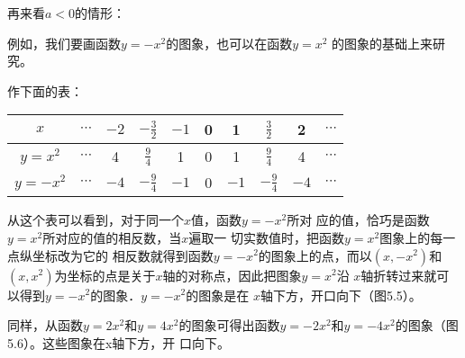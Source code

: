 再来看$a<0$的情形：

例如，我们要画函数$y=-x^2$的图象，也可以在函数$y=x^2$
的图象的基础上来研究。

作下面的表：
\begin{center}
\begin{tabular}{c|ccccccccc}
    \hline
$x$ &$\cdots$ & $-2$  & $-\tfrac{3}{2}$  & $-1$   & 0   & 1&$\tfrac{3}{2}$& 2&$\cdots$\\
\hline
$y=x^2$ &$\cdots$ & 4&$\tfrac{9}{4}$&1  & 0   & 1&$\tfrac{9}{4}$&4&$\cdots$\\
$y=-x^2$ &$\cdots$ & $-4$&$-\tfrac{9}{4}$&$-1$  & 0   & $-1$&$-\tfrac{9}{4}$&$-4$&$\cdots$\\
\hline
\end{tabular}    
\end{center}

从这个表可以看到，对于同一个$x$值，函数$y=-x^2$所对
应的值，恰巧是函数$y=x^2$所对应的值的相反数，当$x$遍取一
切实数值时，把函数$y=x^2$图象上的每一点纵坐标改为它的
相反数就得到函数$y=-x^2$的图象上的点，而以$(x,-x^2)$和
$(x,x^2)$为坐标的点是关于$x$轴的对称点，因此把图象$y=x^2$沿
$x$轴折转过来就可以得到$y=-x^2$的图象．$y=-x^2$的图象是在
$x$轴下方，开口向下（图5.5）。

同样，从函数$y=2x^2$和$y=4x^2$的图象可得出函数$y=
-2x^2$和$y=-4x^2$的图象（图5.6）。这些图象在x轴下方，开
口向下。

